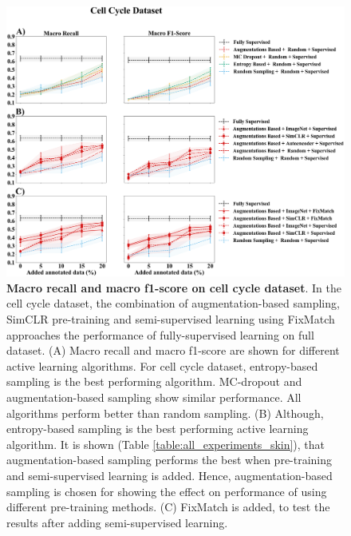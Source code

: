 \begin{figure}[htbp]
\centering
\captionsetup{format=plain}
\includegraphics[width=\textwidth]{figures/fig_2_cycle_recall_f1.png}
\caption[Macro recall and macro f1-score on cell cycle dataset]{\textbf{Macro recall and macro f1-score on cell cycle dataset}. In the cell cycle dataset, the combination of augmentation-based sampling, SimCLR pre-training and semi-supervised learning using FixMatch approaches the performance of fully-supervised learning on full dataset. (A) Macro recall and macro f1-score are shown for different active learning algorithms. For cell cycle dataset, entropy-based sampling is the best performing algorithm. MC-dropout and augmentation-based sampling show similar performance. All algorithms perform better than random sampling. (B) Although, entropy-based sampling is the best performing active learning algorithm. It is shown (Table \ref{table:all_experiments_skin}), that augmentation-based sampling performs the best when pre-training and semi-supervised learning is added. Hence, augmentation-based sampling is chosen for showing the effect on performance of using different pre-training methods. (C) FixMatch is added, to test the results after adding semi-supervised learning.}
\label{fig:fig_2_cycle_recall_f1}
\end{figure}

